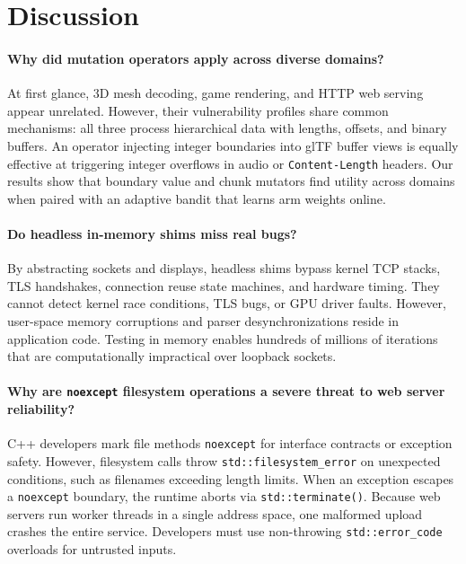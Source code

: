 \section{Discussion}
\label{sec:discussion}

\paragraph{Why did mutation operators apply across diverse domains?}
At first glance, 3D mesh decoding, game rendering, and HTTP web serving appear unrelated.
However, their vulnerability profiles share common mechanisms: all three process hierarchical data with lengths, offsets, and binary buffers.
An operator injecting integer boundaries into glTF buffer views is equally effective at triggering integer overflows in \raylib audio or \drogon \texttt{Content-Length} headers.
Our results show that boundary value and chunk mutators find utility across domains when paired with an adaptive bandit that learns arm weights online.

\paragraph{Do headless in-memory shims miss real bugs?}
By abstracting sockets and displays, headless shims bypass kernel TCP stacks, TLS handshakes, connection reuse state machines, and hardware timing.
They cannot detect kernel race conditions, TLS bugs, or GPU driver faults.
However, user-space memory corruptions and parser desynchronizations reside in application code.
Testing in memory enables hundreds of millions of iterations that are computationally impractical over loopback sockets.

\paragraph{Why are \texttt{noexcept} filesystem operations a severe threat to web server reliability?}
C++ developers mark file methods \texttt{noexcept} for interface contracts or exception safety.
However, filesystem calls throw \texttt{std::filesystem\_error} on unexpected conditions, such as filenames exceeding length limits.
When an exception escapes a \texttt{noexcept} boundary, the runtime aborts via \texttt{std::terminate()}.
Because web servers run worker threads in a single address space, one malformed upload crashes the entire service.
Developers must use non-throwing \texttt{std::error\_code} overloads for untrusted inputs.

